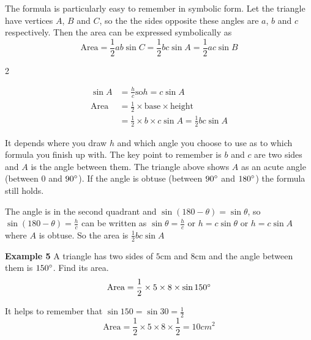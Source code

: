 The formula is particularly easy to remember in symbolic form. Let the triangle have vertices $A$, $B$ and $C$, so the the sides opposite these angles are $a$, $b$ and $c$ respectively. Then the area can be expressed symbolically as
\begin{equation*}\text{Area} =\frac{1}{2} a b \sin  C =\frac{1}{2} b c \sin  A =\frac{1}{2} a c \sin  B
\end{equation*}

\columnsep =30pt
\begin {multicols}{2} 
\setlength\fboxrule{0in}\setlength\fboxsep{0.2in}

\begin{align*}\sin  A &  = \frac{h}{c}\text{so}h =c \sin  A \\
\text{Area} &  =  \frac{1}{2} \times \text{base} \times \text{height} \\
 &  =  \frac{1}{2} \times b \times c \sin  A =\frac{1}{2} b c \sin  A
 \end{align*}
\end {multicols}

It depends where you draw $h$ and which angle you choose to use as to which formula you finish up with. The key point to remember is $b$ and $c$ are two sides and $A$ is the angle between them. The triangle above shows $A$ as an acute angle (between $0$ and $90 \mbox{{\ensuremath{{}^\circ}}}$). If the angle is obtuse (between $90 \mbox{{\ensuremath{{}^\circ}}}$ and $180 \mbox{{\ensuremath{{}^\circ}}}$) the formula still holds. 
   
\setlength\fboxrule{0in}\setlength\fboxsep{0.2in}

The angle is in the second quadrant and $\sin  (180 -\theta ) =\sin  \theta $, so $\sin  (180 -\theta ) =\frac{h}{c}$ can be written as $\sin  \theta  =\frac{h}{c}$ or $h =c \sin  \theta $ or $h =c \sin  A$ where $A$ is obtuse. So the area is $\frac{1}{2} b c \sin  A$ 

\textbf{Example 5}
A triangle has two sides of $5 \mbox{cm}$ and $8 \mbox{cm}$ and the angle between them is $150 \mbox{{\ensuremath{{}^\circ}}}$. Find its area.
\begin{equation*}\text{Area} =\frac{1}{2} \times 5 \times 8 \times \sin  150 \mbox{{\ensuremath{{}^\circ}}}
\end{equation*}

It helps to remember that $\sin  150 =\sin  30 =\frac{1}{2}$
\begin{equation*}\text{Area} =\frac{1}{2} \times 5 \times 8 \times \frac{1}{2} =10 cm^{2}
\end{equation*}



